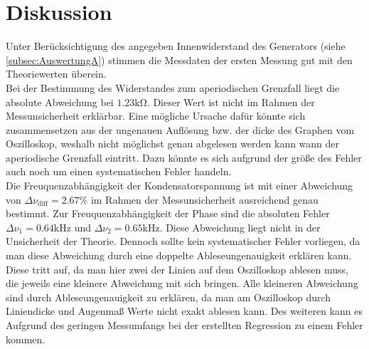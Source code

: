 \section{Diskussion}
\label{sec:Diskussion}
Unter Berücksichtigung des angegeben Innenwiderstand des Generators (siehe \autoref{subsec:AuswertungA}) stimmen die Messdaten der ersten Messung gut mit den Theoriewerten überein. \\
Bei der Bestimmung des Widerstandes zum aperiodischen Grenzfall liegt die absolute Abweichung bei $1.23 \unit{\kilo\ohm}$. Dieser Wert ist nicht im Rahmen der Messunsicherheit 
erklärbar. Eine mögliche Ursache dafür könnte sich zusammensetzen aus der ungenauen Auflösung bzw. der dicke des Graphen vom Oszilloskop, weshalb nicht möglichst genau abgelesen 
werden kann wann der aperiodische Grenzfall eintritt. Dazu könnte es sich aufgrund der größe des Fehler auch noch um einen systematischen Fehler handeln. \\ 
Die Freuquenzabhängigkeit der Kondensatorspannung ist mit einer Abweichung von $\Delta \nu_{\text{diff}} = 2.67\%$ im Rahmen der Messunsicherheit ausreichend genau bestimmt.
Zur Freuquenzabhängigkeit der Phase sind die absoluten Fehler $\Delta \nu_1 = 0.64 \unit{\kilo\hertz}$ und $\Delta \nu_2 = 0.65 \unit{\kilo\hertz}$. Diese Abweichung liegt nicht
in der Unsicherheit der Theorie. Dennoch sollte kein systematischer Fehler vorliegen, da man diese Abweichung durch eine doppelte Ableseungenauigkeit erklären kann. Diese tritt 
auf, da man hier zwei der Linien auf dem Oszilloskop ablesen muss, die jeweils eine kleinere Abweichung mit sich bringen.  
Alle kleineren Abweichung sind durch Ableseungenauigkeit zu erklären, da man am Oszilloskop durch Liniendicke und Augenmaß Werte nicht exakt ablesen kann.
Des weiteren kann es Aufgrund des geringen Messumfangs bei der erstellten Regression zu einem Fehler kommen. 